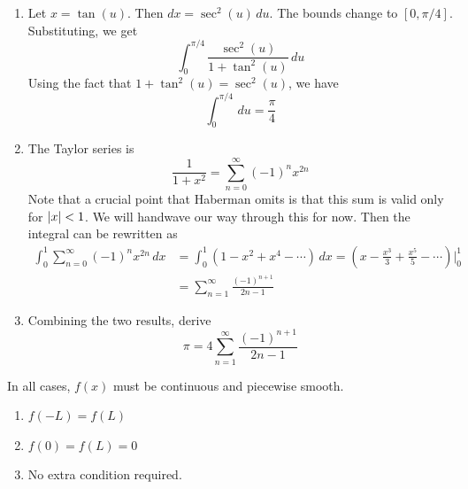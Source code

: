 \documentclass[a4paper]{article}
\begin{document}
\begin{enumerate}[label=(\alph*)]
	\item Let \( x = \tan\!\left(u\right) \). Then \( dx = \sec^{2}\!\left(u\right) \, du \). The bounds change to \( \!\left[ 0,\pi / 4 \right] \). Substituting, we get
	\[
		\int^{\pi / 4}_{0} \frac{\sec^{2}\!\left(u\right)}{1 + \tan^{2}\!\left(u\right)} \, du  
	\]
	Using the fact that \( 1 + \tan^{2}\!\left(u\right) = \sec^{2}\!\left(u\right) \), we have
	\[
		\int^{\pi / 4}_{0}  \, du = \frac{\pi}{4}
	\]
	\item The Taylor series is
	\[
		\frac{1}{1 + x^{2}} = \sum^{\infty}_{n=0} \!\left( -1 \right)^{n}x^{2n} 
	\]
	Note that a crucial point that Haberman omits is that this sum is valid only for \( \abs{x} < 1 \). We will handwave our way through this for now. Then the integral can be rewritten as 
	\begin{align*}
		\int^{1}_{0} \sum^{\infty}_{n=0} \!\left( -1 \right)^{n}x^{2n} \, dx & = \int^{1}_{0} \!\left( 1 - x^{2} + x^{4} - \cdots \right) \, dx = \!\left( x - \frac{x^{3}}{3} + \frac{x^{5}}{5} - \cdots \right)\Big|^{1}_{0} \\
										     & = \sum^{\infty}_{n=1} \frac{\!\left( -1 \right)^{n + 1}}{2n - 1}
	\end{align*}
	\item Combining the two results, derive
	\[
		\pi = 4 \sum^{\infty}_{n=1} \frac{\left( -1 \right)^{n + 1}}{2n - 1}
	\]
\end{enumerate}

\newpage

In all cases, \( f \!\left( x \right) \) must be continuous and piecewise smooth.
\begin{enumerate}[label=(\alph*)]
	\item \( f \!\left( -L \right) = f \!\left( L \right) \)
	\item \( f \!\left( 0 \right) = f \!\left( L \right) = 0 \)
	\item No extra condition required.
\end{enumerate}
\end{document}
